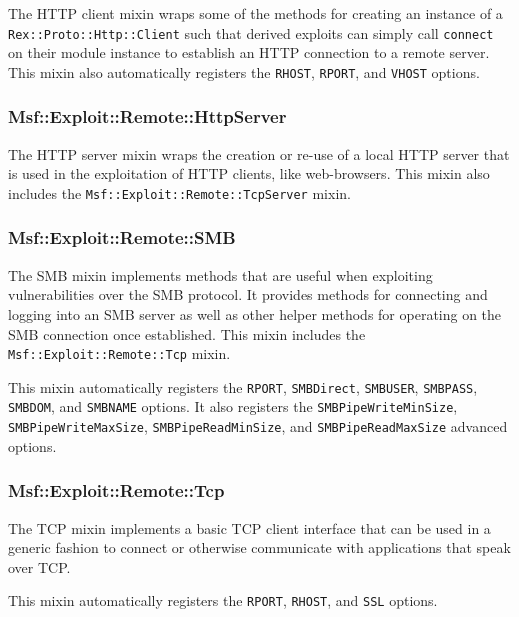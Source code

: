 \documentclass{report}
\begin{document}
\par
The HTTP client mixin wraps some of the methods for creating an
instance of a \texttt{Rex::Proto::Http::Client} such that derived
exploits can simply call \texttt{connect} on their module instance
to establish an HTTP connection to a remote server.  This mixin also
automatically registers the \texttt{RHOST}, \texttt{RPORT}, and
\texttt{VHOST} options.

            \subsubsection{Msf::Exploit::Remote::HttpServer}

\par
The HTTP server mixin wraps the creation or re-use of a local HTTP
server that is used in the exploitation of HTTP clients, like
web-browsers.  This mixin also includes the
\texttt{Msf::Exploit::Remote::TcpServer} mixin.

            \subsubsection{Msf::Exploit::Remote::SMB}

\par
The SMB mixin implements methods that are useful when exploiting
vulnerabilities over the SMB protocol.  It provides methods for
connecting and logging into an SMB server as well as other helper
methods for operating on the SMB connection once established.  This
mixin includes the \texttt{Msf::Exploit::Remote::Tcp} mixin.

\par
This mixin automatically registers the \texttt{RPORT},
\texttt{SMBDirect}, \texttt{SMBUSER}, \texttt{SMBPASS},
\texttt{SMBDOM}, and \texttt{SMBNAME} options.  It also registers
the \texttt{SMBPipeWriteMinSize}, \texttt{SMBPipeWriteMaxSize},
\texttt{SMBPipeReadMinSize}, and \texttt{SMBPipeReadMaxSize}
advanced options.

            \subsubsection{Msf::Exploit::Remote::Tcp}

\par
The TCP mixin implements a basic TCP client interface that can be
used in a generic fashion to connect or otherwise communicate with
applications that speak over TCP.

\par
This mixin automatically registers the \texttt{RPORT},
\texttt{RHOST}, and \texttt{SSL} options.
\end{document}
